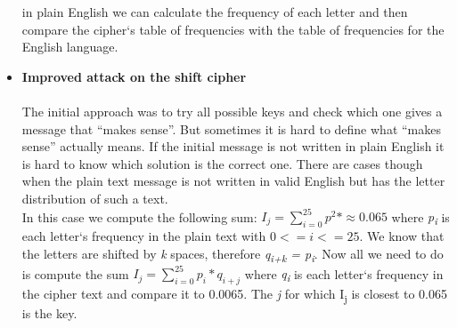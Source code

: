 \begin{itemize}
	in plain English we can calculate the frequency of each letter and then compare the cipher`s table of frequencies with the table of frequencies for the English language.
	    \item \textbf{Improved attack on the shift cipher}\\\\
	The initial approach was to try all possible keys and check which one gives a message that
	``makes sense''. But sometimes it is hard to define what ``makes sense'' actually means. If the
	initial message is not written in plain English it is hard to know which solution is the correct one.
	There are cases though when the plain text message is not written in valid English but has the
	letter distribution of such a text.\\
	In this case we compute the following sum: \begin{math}I_j = \sum_{i=0}^{25} p^2*\approx0.065\end{math} where \textit{p\textsubscript{i}} is each letter`s frequency in the plain text with \begin{math}0<=i<=25\end{math}. We know that the letters are shifted by \textit{k} spaces, therefore \textit{q\textsubscript{i+k} = p\textsubscript{i}}. Now all we need to do is compute the sum \begin{math}I_j = \sum_{i=0}^{25} p_i*q_{i+j}\end{math} where \textit{q\textsubscript{i}} is each letter`s frequency in the cipher text and compare it to 0.0065. The \textit{j} for which I\textsubscript{j} is closest to 0.065 is the key. 


\end{itemize}
